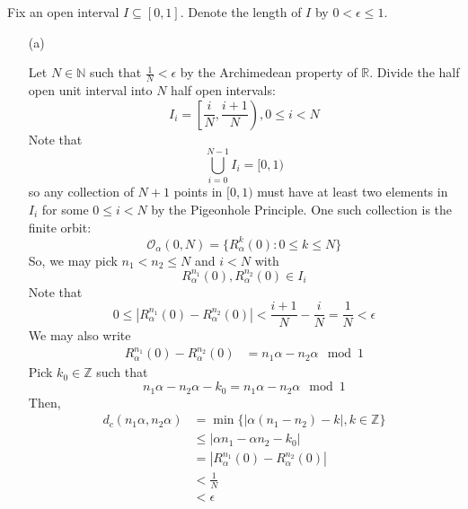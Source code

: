 \documentclass[12pt, reqno]{amsart}
\theoremstyle{definition}
\theoremstyle{remark}
\newcommand{\ud}{\mathrm{d}}
\begin{document}
\begin{itemize}



\vspace{0.1 cm}
Fix an open interval $I \subseteq [0,1]$. Denote the length of $I$ by $0< \epsilon \leq 1$. 
\begin{itemize}
\item[(a)] 

Let $N\in \mathbb{N}$ such that $\frac{1}{N}<\epsilon$ by the Archimedean property of $\mathbb{R}$. Divide the half open unit interval into $N$ half open intervals: $$I_{i}=\left[\frac{i}{N},\frac{i+1}{N}\right),0\le i< N$$Note that $$\bigcup_{i=0}^{N-1}I_{i}=[0,1)$$so any collection of $N+1$ points in $[0,1)$ must have at least two elements in $I_{i}$ for some $0\le i<N$ by the Pigeonhole Principle. One such collection is the finite orbit: $$\mathcal{O}_{\alpha}(0,N)=\{R_{\alpha}^{k}(0):0\le k\le N\}$$So, we may pick $n_{1}< n_{2}\le N$ and $i< N$ with $$R_{\alpha}^{n_{1}}(0),R_{\alpha}^{n_{2}}(0)\in I_{i}$$Note that $$0\le|R_{\alpha}^{n_{1}}(0)-R_{\alpha}^{n_{2}}(0)|< \frac{i+1}{N}- \frac{i}{N}= \frac{1}{N}< \epsilon$$We may also write \begin{align*}
    R_{\alpha}^{n_{1}}(0)-R_{\alpha}^{n_{2}}(0)&= n_{1}\alpha-n_{2}\alpha\mod1
    \end{align*}
    Pick $k_{0}\in\mathbb{Z}$ such that $$n_{1}\alpha-n_{2}\alpha-k_{0}=n_{1}\alpha-n_{2}\alpha\mod1$$Then,
    \begin{align*}
        d_{c}(n_{1}\alpha,n_{2}\alpha)&= \min\{|\alpha(n_{1}-n_{2})-k|,k\in \mathbb{Z}\}\\
        &\le |\alpha n_{1}-\alpha n_{2}-k_{0}|\\
        &= |R_{\alpha}^{n_{1}}(0)-R_{\alpha}^{n_{2}}(0)|\\
        &< \frac{1}{N}\\
        &< \epsilon
    \end{align*}
    


\end{itemize}
\end{itemize}
\end{document}
